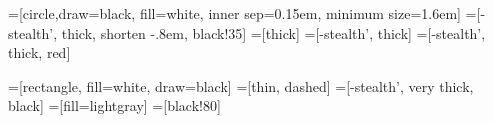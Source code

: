 \usetikzlibrary{arrows}

=[circle,draw=black, fill=white, inner sep=0.15em, minimum size=1.6em]
=[-stealth', thick, shorten -.8em, black!35]
=[thick]
=[-stealth', thick]
=[-stealth', thick, red]

=[rectangle, fill=white, draw=black]
=[thin, dashed]
=[-stealth', very thick, black]
=[fill=lightgray]
=[black!80]
